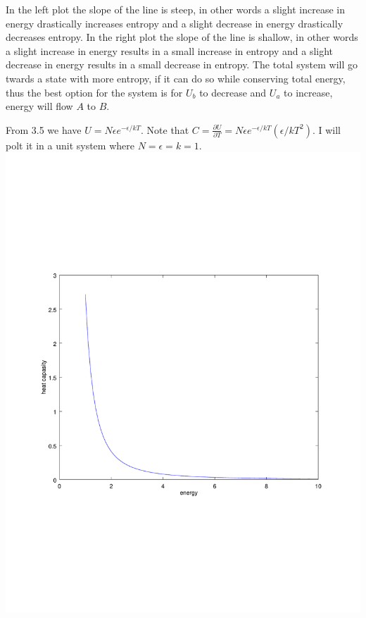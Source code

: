 \documentclass[12pt]{article}
\makeatletter
\theoremstyle{homework}
\newenvironment{exercise}[1]
{\def\@currentlabel{#1}\exercisecore}
{\endexercisecore}
\makeatother
\begin{document}
\begin{exercise}{3.3}
In the left plot the slope of the line is steep, in other words a slight increase in energy drastically increases entropy and a slight decrease in energy drastically decreases entropy.  In the right plot the slope of the line is shallow, in other words a slight increase in energy results in a small increase in entropy and a slight decrease in energy results in a small decrease in entropy.  The total system will go twards a state with more entropy, if it can do so while conserving total energy, thus the best option for the system is for $U_b$ to decrease and $U_a$ to increase, energy will flow $A$ to $B$.
\end{exercise}

\begin{exercise}{3.8}
From 3.5 we have $U=N\epsilon e^{-\epsilon/kT}$.  Note that $C=\frac{\partial U}{\partial T}=N\epsilon e^{-\epsilon/kT}(\epsilon/kT^2)$.  I will polt it in a unit system where $N=\epsilon=k=1$.\\
\includegraphics[scale=.6]{../octave/f1.pdf}
\end{exercise}
\end{document}
